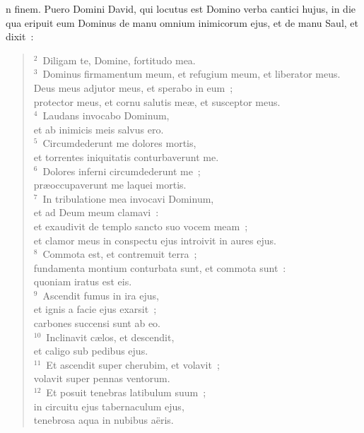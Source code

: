 \bchapter
{}n finem. Puero Domini David, qui locutus est Domino verba cantici hujus, in die qua eripuit eum Dominus de manu omnium inimicorum ejus, et de manu Saul, et dixit~:
\begin{flushleft}\begin{verse}\vspace{6pt}${}^{2}$~Diligam te, Domine, fortitudo mea.\\
${}^{3}$~Dominus firmamentum meum, et refugium meum, et liberator meus.\\ Deus meus adjutor meus, et sperabo in eum~;\\ protector meus, et cornu salutis me\ae , et susceptor meus.\\
${}^{4}$~Laudans invocabo Dominum,\\ et ab inimicis meis salvus ero.\\
${}^{5}$~Circumdederunt me dolores mortis,\\ et torrentes iniquitatis conturbaverunt me.\\
${}^{6}$~Dolores inferni circumdederunt me~;\\ pr\ae occupaverunt me laquei mortis.\\
${}^{7}$~In tribulatione mea invocavi Dominum,\\ et ad Deum meum clamavi~:\\ et exaudivit de templo sancto suo vocem meam~;\\ et clamor meus in conspectu ejus introivit in aures ejus.\\
${}^{8}$~Commota est, et contremuit terra~;\\ fundamenta montium conturbata sunt, et commota sunt~:\\ quoniam iratus est eis.\\
${}^{9}$~Ascendit fumus in ira ejus,\\ et ignis a facie ejus exarsit~;\\ carbones succensi sunt ab eo.\\
${}^{10}$~Inclinavit c\ae los, et descendit,\\ et caligo sub pedibus ejus.\\
${}^{11}$~Et ascendit super cherubim, et volavit~;\\ volavit super pennas ventorum.\\
${}^{12}$~Et posuit tenebras latibulum suum~;\\ in circuitu ejus tabernaculum ejus,\\ tenebrosa aqua in nubibus a\"eris.\\

\end{verse}
\end{flushleft}
